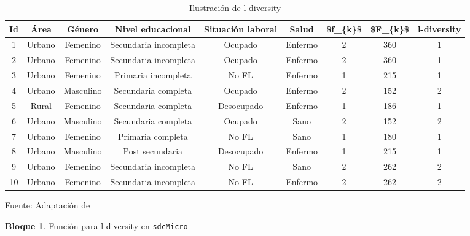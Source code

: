 \documentclass[
]{book}
\newenvironment{Shaded}{\begin{snugshade}}{\end{snugshade}}
\newcommand{\AttributeTok}[1]{\textcolor[rgb]{0.77,0.63,0.00}{#1}}
\newcommand{\CommentTok}[1]{\textcolor[rgb]{0.56,0.35,0.01}{\textit{#1}}}
\newcommand{\ConstantTok}[1]{\textcolor[rgb]{0.00,0.00,0.00}{#1}}
\newcommand{\DecValTok}[1]{\textcolor[rgb]{0.00,0.00,0.81}{#1}}
\newcommand{\FunctionTok}[1]{\textcolor[rgb]{0.00,0.00,0.00}{#1}}
\newcommand{\NormalTok}[1]{#1}
\newcommand{\OtherTok}[1]{\textcolor[rgb]{0.56,0.35,0.01}{#1}}
\newcommand{\SpecialCharTok}[1]{\textcolor[rgb]{0.00,0.00,0.00}{#1}}
\newcommand{\StringTok}[1]{\textcolor[rgb]{0.31,0.60,0.02}{#1}}
\theoremstyle{definition}
\theoremstyle{definition}
\newtheorem{example}{Bloque}[chapter]
\theoremstyle{definition}
\theoremstyle{definition}
\theoremstyle{remark}
\begin{document}
\begin{table}

\caption{\label{tab:tabMR3}Ilustración de l-diversity}
\centering
\begin{tabular}[t]{c|c|c|c|c|c|c|c|c}
\hline
Id & Área & Género & Nivel educacional & Situación laboral & Salud & \$f\_\{k\}\$ & \$F\_\{k\}\$  & l-diversity\\
\hline
1 & Urbano & Femenino & Secundaria incompleta & Ocupado & Enfermo & 2 & 360 & 1\\
\hline
2 & Urbano & Femenino & Secundaria incompleta & Ocupado & Enfermo & 2 & 360 & 1\\
\hline
3 & Urbano & Femenino & Primaria incompleta & No FL & Enfermo & 1 & 215 & 1\\
\hline
4 & Urbano & Masculino & Secundaria completa & Ocupado & Enfermo & 2 & 152 & 2\\
\hline
5 & Rural & Femenino & Secundaria completa & Desocupado & Enfermo & 1 & 186 & 1\\
\hline
6 & Urbano & Masculino & Secundaria completa & Ocupado & Sano & 2 & 152 & 2\\
\hline
7 & Urbano & Femenino & Primaria completa & No FL & Sano & 1 & 180 & 1\\
\hline
8 & Urbano & Masculino & Post secundaria & Desocupado & Enfermo & 1 & 215 & 1\\
\hline
9 & Urbano & Femenino & Secundaria incompleta & No FL & Sano & 2 & 262 & 2\\
\hline
10 & Urbano & Femenino & Secundaria incompleta & No FL & Enfermo & 2 & 262 & 2\\
\hline
\end{tabular}
\end{table}

Fuente: Adaptación de \citep[p.33]{benschop}

\begin{example}
\protect\hypertarget{exm:bloqueMR6}{}\label{exm:bloqueMR6}Función para l-diversity en \texttt{sdcMicro}
\end{example}

\begin{Shaded}
\end{Shaded}
\end{document}
